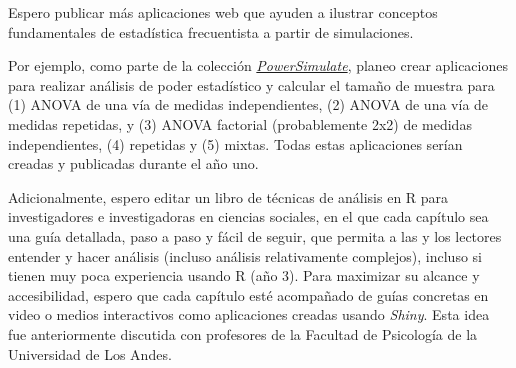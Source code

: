 \documentclass[11pt,a4paper,]{awesome-cv}
\begin{document}
\begin{footnotesize}

Espero publicar más aplicaciones web que ayuden a ilustrar conceptos fundamentales de estadística frecuentista a partir de simulaciones. 

Por ejemplo, como parte de la colección \href{https://shiny.jdl-svr.lat/PowerSimulate/}{\textit{PowerSimulate}}, planeo crear aplicaciones para realizar análisis de poder estadístico y calcular el tamaño de muestra para (1) ANOVA de una vía de medidas independientes, (2) ANOVA de una vía de medidas repetidas, y (3) ANOVA factorial (probablemente 2x2) de medidas independientes, (4) repetidas y (5) mixtas. Todas estas aplicaciones serían creadas y publicadas durante el año uno.

Adicionalmente, espero editar un libro de técnicas de análisis en R para investigadores e investigadoras en ciencias sociales, en el que cada capítulo sea una guía detallada, paso a paso y fácil de seguir, que permita a las y los lectores entender y hacer análisis (incluso análisis relativamente complejos), incluso si tienen muy poca experiencia usando R (año 3). Para maximizar su alcance y accesibilidad, espero que cada capítulo esté acompañado de guías concretas en video o medios interactivos como aplicaciones creadas usando \textit{Shiny}. Esta idea fue anteriormente discutida con profesores de la Facultad de Psicología de la Universidad de Los Andes. 



\end{footnotesize}
\end{document}
